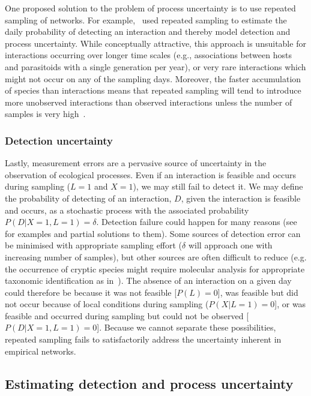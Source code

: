 \documentclass[12pt]{article}
\begin{document}
\begin{spacing}{2.0}
         One proposed solution to the problem of process uncertainty is to use repeated sampling of networks. For example,~\citet{Weinstein2017} used repeated sampling to estimate the daily probability of detecting an interaction and thereby model detection and process uncertainty. While conceptually attractive, this approach is unsuitable for interactions occurring over longer time scales (e.g., associations between hosts and parasitoids with a single generation per year), or very rare interactions which might not occur on any of the sampling days. Moreover, the faster accumulation of species than interactions means that repeated sampling will tend to introduce more unobserved interactions than observed interactions unless the number of samples is very high~\citep{Poisot2012}.


        \subsubsection*{Detection uncertainty} 

          Lastly, measurement errors are a pervasive source of uncertainty in the observation of ecological processes. Even if an interaction is feasible and occurs during sampling ($L = 1$ and $X = 1$), we may still fail to detect it. We may define the probability of detecting of an interaction, $D$, given the interaction is feasible and occurs, as a stochastic process with the associated probability $P(D|X=1,L=1)=\delta$. Detection failure could happen for many reasons (see~\citet{Wirta2014} for examples and partial solutions to them). Some sources of detection error can be minimised with appropriate sampling effort ($\delta$ will approach one with increasing number of samples), but other sources are often difficult to reduce (e.g. the occurrence of cryptic species might require molecular analysis for appropriate taxonomic identification as in~\citealt{Wirta2014,Frost2016}). The absence of an interaction on a given day could therefore be because it was not feasible [$P(L) = 0$], was feasible but did not occur because of local conditions during sampling ($P(X|L=1) = 0$], or was feasible and occurred during sampling but could not be observed [$P(D|X=1,L=1)=0$]. Because we cannot separate these possibilities, repeated sampling fails to satisfactorily address the uncertainty inherent in empirical networks.


    \subsection*{Estimating detection and process uncertainty}


\end{spacing}
\end{document}
